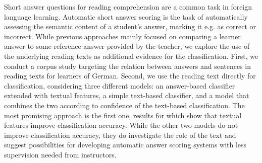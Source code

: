 Short answer questions for reading comprehension are a common task   in foreign language learning. Automatic short answer scoring is the
   task of automatically assessing the semantic content of a student's
   answer, marking it e.g. as correct or incorrect. While previous
   approaches mainly focused on comparing a learner answer to some
   reference answer provided by the teacher, we explore the use of the
   underlying reading texts as additional evidence for the
   classification. First, we conduct a corpus study targeting the
   relation between answers and sentences in reading texts for learners
   of German. Second, we use the reading text directly for
   classification, considering three different models: an answer-based
   classifier extended with textual features, a simple text-based
   classifier, and a model that combines the two according to
   confidence of the text-based classification. The most promising
   approach is the first one, results for which show that textual
   features improve classification accuracy. While the other two models
   do not improve classification accuracy, they do investigate the role
   of the text and suggest possibilities for developing automatic
   answer scoring systems with less supervision needed from
   instructors.

